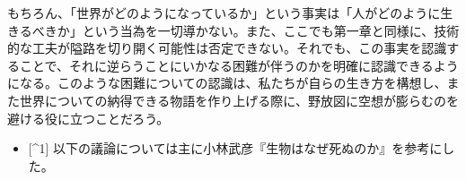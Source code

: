 もちろん、「世界がどのようになっているか」という事実は「人がどのように生きるべきか」という当為を一切導かない。また、ここでも第一章と同様に、技術的な工夫が隘路を切り開く可能性は否定できない。それでも、この事実を認識することで、それに逆らうことにいかなる困難が伴うのかを明確に認識できるようになる。このような困難についての認識は、私たちが自らの生き方を構想し、また世界についての納得できる物語を作り上げる際に、野放図に空想が膨らむのを避ける役に立つことだろう。

\begin{itemize}
\tightlist
\item
  {[}\^{}1{]}
  以下の議論については主に小林武彦『生物はなぜ死ぬのか』を参考にした。
\end{itemize}
